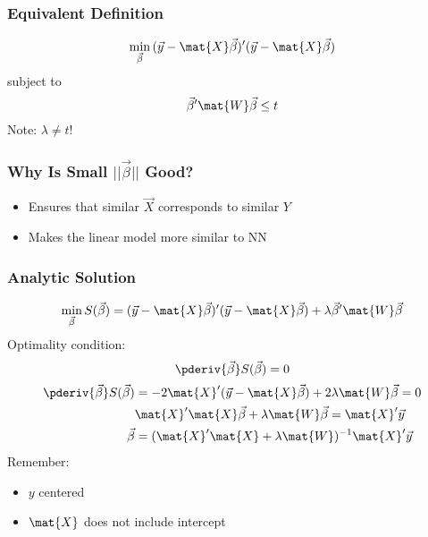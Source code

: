 \documentclass[mathserif, xcolor=table, svgnames]{beamer}
\begin{document}
\begin{frame}
  \frametitle{Equivalent Definition}
  \begin{equation*}
    \min_{\vec{\beta}} \, (\vec{y} - \mat{X}\vec{\beta})'(\vec{y} - \mat{X}\vec{\beta})
  \end{equation*}
  subject to
  \begin{equation*}
    \vec{\beta}' \mat{W} \vec{\beta} \le t
  \end{equation*}
  Note: $\lambda \not= t$!
\end{frame}

\begin{frame}
  \frametitle{Why Is Small $||\vec{\beta}||$ Good?}
  \begin{itemize}
  \item Ensures that similar $\vec{X}$ corresponds to similar $Y$
  \item Makes the linear model more similar to NN
  \end{itemize}
\end{frame}

\begin{frame}
  \frametitle{Analytic Solution}
  \begin{equation*}
    \min_{\vec{\beta}} S(\vec{\beta}) = (\vec{y} - \mat{X}\vec{\beta})'(\vec{y} - \mat{X}\vec{\beta})
    + \lambda \vec{\beta}' \mat{W} \vec{\beta}
  \end{equation*}
  Optimality condition:
  \begin{equation*}
    \pderiv{\vec{\beta}}S(\vec{\beta}) = 0
  \end{equation*}
  \begin{align*}
    \pderiv{\vec{\beta}}S(\vec{\beta})
    &=
    -2 \mat{X}' (\vec{y} - \mat{X}\vec{\beta}) + 2\lambda
    \mat{W}\vec{\beta} = 0
    \\
    & \mat{X}'\mat{X} \vec{\beta} + \lambda \mat{W}\vec{\beta} = 
      \mat{X}' \vec{y}
    \\
    \vec{\beta} &= (\mat{X}' \mat{X} + \lambda \mat{W})^{-1}
                  \mat{X}' \vec{y}
  \end{align*}
  Remember:
  \begin{itemize}
  \item $y$ centered
  \item $\mat{X}$ does not include intercept
  \end{itemize}
\end{frame}
\end{document}
